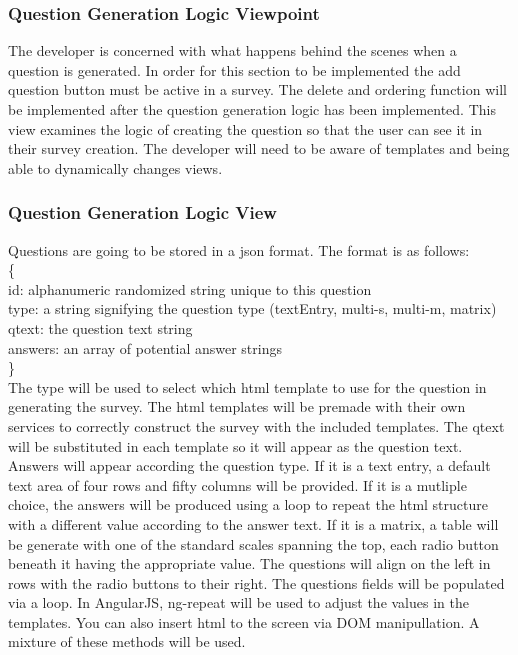 \subsubsection{Question Generation Logic Viewpoint}
The developer is concerned with what happens behind the scenes when a question is generated. In order for this section to be 
implemented the add question button must be active in a survey. The delete and ordering function will be implemented after the 
question generation logic has been implemented. This view examines the logic of creating the question so that the user can see 
it in their survey creation. The developer will need to be aware of templates and being able to dynamically changes views. 
\subsubsection{Question Generation Logic View}
Questions are going to be stored in a json format. The format is as follows: \\
\{\\
\indent id: alphanumeric randomized string unique to this question \\
\indent type: a string signifying the question type (textEntry, multi-s, multi-m, matrix)\\
\indent qtext: the question text string \\
\indent answers: an array of potential answer strings\\
\}\\
The type will be used to select which html template to use for the question in generating the survey. The html templates will be
premade with their own services to correctly construct the survey with the included templates. The qtext will be substituted in each 
template so it will appear as the question text. Answers will appear according the question type. If it is a text entry, a default text area of four rows and fifty columns will be provided. If it is a mutliple choice, the answers will be produced using a loop to repeat the html structure with a different value according to the answer text. If it is a matrix, a table will be generate with one of the standard scales spanning the top, each radio button beneath it having the appropriate value. The questions will align on the left in rows with 
the radio buttons to their right. The questions fields will be populated via a loop. In AngularJS, ng-repeat will be used to adjust the values in the templates. You can also insert html to the screen via DOM manipullation. A mixture of these methods will be used. 

